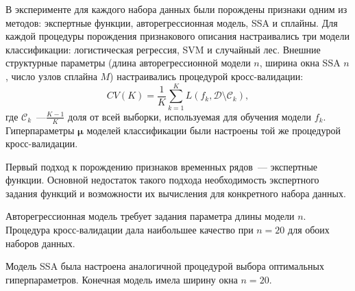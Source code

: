 В эксперименте для каждого набора данных были порождены признаки одним из методов: экспертные функции, авторегрессионная модель, SSA и сплайны.
Для каждой процедуры порождения признакового описания настраивались три модели классификации: логистическая регрессия, SVM и случайный лес.
Внешние структурные параметры (длина авторегрессионной модели $n$, ширина окна SSA $n$, число узлов сплайна $M$) настраивались процедурой кросс-валидации:
\begin{equation*}
	CV(K) = \frac{1}{K}\sum_{k=1}^{K} L(f_k, \mathcal{D}\setminus \mathcal{C}_k),
\end{equation*}
где $\mathcal{C}_k$~---$\frac{K-1}{K}$ доля от всей выборки, используемая для обучения модели $f_k$.
Гиперпараметры $\boldsymbol{\mu}$ моделей классификации были настроены той же процедурой кросс-валидации.

Первый подход к порождению признаков временных рядов~--- экспертные функции.
Основной недостаток такого подхода необходимость экспертного задания функций и возможности их вычисления для конкретного набора данных.

Авторегрессионная модель требует задания параметра длины модели $n$. 
Процедура кросс-валидации дала наибольшее качество при $n=20$ для обоих наборов данных.

Модель SSA была настроена аналогичной процедурой выбора оптимальных гиперпараметров. Конечная модель имела ширину окна $n=20$.

